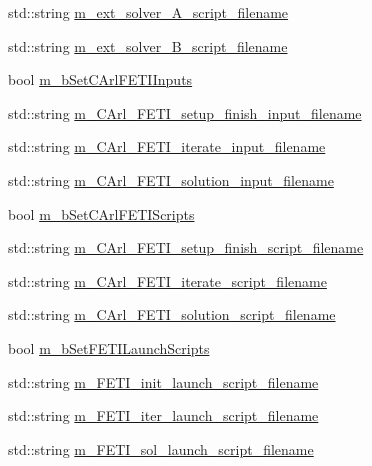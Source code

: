 \begin{DoxyCompactItemize}
\item 
std\+::string \hyperlink{classcarl_1_1_solver___files___setup_a181a314159810779c3c443082ae93563}{m\+\_\+ext\+\_\+solver\+\_\+\+A\+\_\+script\+\_\+filename}
\item 
std\+::string \hyperlink{classcarl_1_1_solver___files___setup_a333e20119d68b1d0dda2494823ae08d4}{m\+\_\+ext\+\_\+solver\+\_\+\+B\+\_\+script\+\_\+filename}
\item 
bool \hyperlink{classcarl_1_1_solver___files___setup_a6b870a23c889843abc86e19580f27a96}{m\+\_\+b\+Set\+C\+Arl\+F\+E\+T\+I\+Inputs}
\item 
std\+::string \hyperlink{classcarl_1_1_solver___files___setup_a24d691377ccdddf6fe29e3025bc53c13}{m\+\_\+\+C\+Arl\+\_\+\+F\+E\+T\+I\+\_\+setup\+\_\+finish\+\_\+input\+\_\+filename}
\item 
std\+::string \hyperlink{classcarl_1_1_solver___files___setup_a2e7e17a2974bf14101e4a2e37cc893fb}{m\+\_\+\+C\+Arl\+\_\+\+F\+E\+T\+I\+\_\+iterate\+\_\+input\+\_\+filename}
\item 
std\+::string \hyperlink{classcarl_1_1_solver___files___setup_affd2303fa7ca09f66e2ca07709cc422a}{m\+\_\+\+C\+Arl\+\_\+\+F\+E\+T\+I\+\_\+solution\+\_\+input\+\_\+filename}
\item 
bool \hyperlink{classcarl_1_1_solver___files___setup_a53cf1256ea7a5f375a887d91ddd2ec9a}{m\+\_\+b\+Set\+C\+Arl\+F\+E\+T\+I\+Scripts}
\item 
std\+::string \hyperlink{classcarl_1_1_solver___files___setup_a74f8cd1404471542269a1cc9aa8c8d84}{m\+\_\+\+C\+Arl\+\_\+\+F\+E\+T\+I\+\_\+setup\+\_\+finish\+\_\+script\+\_\+filename}
\item 
std\+::string \hyperlink{classcarl_1_1_solver___files___setup_a9ce875697a888d84dbd186f74e64cd6a}{m\+\_\+\+C\+Arl\+\_\+\+F\+E\+T\+I\+\_\+iterate\+\_\+script\+\_\+filename}
\item 
std\+::string \hyperlink{classcarl_1_1_solver___files___setup_a147113a3a6de5fa59e4236adf08e16b2}{m\+\_\+\+C\+Arl\+\_\+\+F\+E\+T\+I\+\_\+solution\+\_\+script\+\_\+filename}
\item 
bool \hyperlink{classcarl_1_1_solver___files___setup_aa2719c8cc758671a2b5ba6a37ae8e952}{m\+\_\+b\+Set\+F\+E\+T\+I\+Launch\+Scripts}
\item 
std\+::string \hyperlink{classcarl_1_1_solver___files___setup_a2d9e182d84170579a5f605319258360f}{m\+\_\+\+F\+E\+T\+I\+\_\+init\+\_\+launch\+\_\+script\+\_\+filename}
\item 
std\+::string \hyperlink{classcarl_1_1_solver___files___setup_a9f37bf7f6f91b9dcb29641268206a1a0}{m\+\_\+\+F\+E\+T\+I\+\_\+iter\+\_\+launch\+\_\+script\+\_\+filename}
\item 
std\+::string \hyperlink{classcarl_1_1_solver___files___setup_a79c7bb3275ef8c1aee1e6dc857c0b0ea}{m\+\_\+\+F\+E\+T\+I\+\_\+sol\+\_\+launch\+\_\+script\+\_\+filename}
\end{DoxyCompactItemize}


